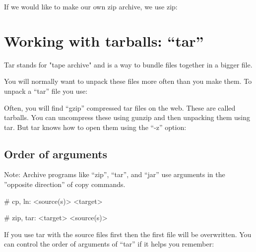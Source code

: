 \begin{prompt}
\end{prompt}

If we would like to make our own zip archive, we use zip:

\begin{prompt}
\end{prompt}

\section{Working with tarballs: ``tar''}

Tar stands for "tape archive" and is a way to bundle files together in a bigger file.

You will normally want to unpack these files more often than you make them. To unpack a ``tar'' file you use:

\begin{prompt}
\end{prompt}

Often, you will find ``gzip'' compressed tar files on the web. These are called tarballs. You can uncompress these using gunzip and then unpacking them using tar. But tar knows how to open them using the ``-z'' option:

\begin{prompt}
\end{prompt}

\subsection{Order of arguments}

Note: Archive programs like ``zip'', ``tar'', and ``jar'' use arguments in the ''opposite direction'' of copy commands. 

\begin{prompt}
    # cp, ln: <source(s)> <target>
    
    # zip, tar: <target> <source(s)>
\end{prompt}

If you use tar with the source files first then the first file will be overwritten. You can control the order of arguments of ``tar'' if it helps you remember:

\begin{prompt}
\end{prompt}
